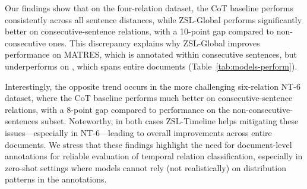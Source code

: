 
Our findings show that on the four-relation \App{} dataset, the CoT baseline performs consistently across all sentence distances, while ZSL-Global performs significantly better on consecutive-sentence relations, with a 10-point gap compared to non-consecutive ones. This discrepancy explains why ZSL-Global improves performance on MATRES, which is annotated within consecutive sentences, but underperforms on \App{}, which spans entire documents (Table~\ref{tab:models-perform}).

Interestingly, the opposite trend occurs in the more challenging six-relation NT-6 dataset, where the CoT baseline performs much better on consecutive-sentence relations, with a 8-point gap compared to performance on the non-consecutive-sentences subset. Noteworthy, in both cases ZSL-Timeline helps mitigating these issues—especially in NT-6—leading to overall improvements across entire documents. We stress that these findings highlight the need for document-level annotations for reliable evaluation of temporal relation classification, especially in zero-shot settings where models cannot rely (not realistically) on distribution patterns in the annotations.



